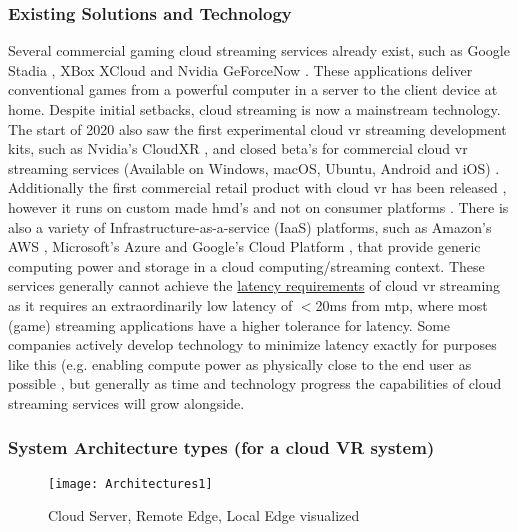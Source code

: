 \subsubsection{Existing Solutions and Technology}
Several commercial gaming cloud streaming services already exist, such as Google Stadia \parencite{stadia}, XBox XCloud \parencite{xcloud} and Nvidia GeForceNow \parencite{geforcenow}. These applications deliver conventional games from a powerful computer in a server to the client device at home. Despite initial setbacks, cloud streaming is now a mainstream technology. The start of 2020 also saw the first experimental cloud \acrshort{vr} streaming development kits, such as Nvidia's CloudXR \parencite{cloudxr}, and closed beta's for commercial cloud \acrshort{vr} streaming services \parencite{shadowvr} (Available on Windows, macOS, Ubuntu, Android and iOS) . Additionally the first commercial retail product with cloud \acrshort{vr} has been released \parencite{zerolight5g}, however it runs on custom made \acrshort{hmd}'s and not on consumer platforms . There is also a variety of Infrastructure\hyp{}as\hyp{}a\hyp{}service (IaaS) platforms, such as Amazon's AWS \parencite{aws}, Microsoft's Azure \parencite{azure} and Google's Cloud Platform \parencite{gcp}, that provide generic computing power and storage in a cloud computing/streaming context.
 These services generally cannot achieve the \hyperref[ssec:vrphy]{latency requirements} of cloud \acrshort{vr} streaming \parencite{survey_IRSS} as it requires an extraordinarily low latency of $<$20\acrshort{ms} from \acrfull{mtp}, where most (game) streaming applications have a higher tolerance for latency. Some companies actively develop technology to minimize latency exactly for purposes like this (e.g. enabling compute power as physically close to the end user as possible \parencite{awswavelength}, but generally as time and technology progress the capabilities of cloud streaming services will grow alongside.

\subsubsection{System Architecture types (for a cloud VR system)}
\begin{figure}[h]
\caption{Cloud Server, Remote Edge, Local Edge visualized \parencite{wlanvr}}
\label{fig:arch1}
\texttt{[image: Architectures1]}
\end{figure}

